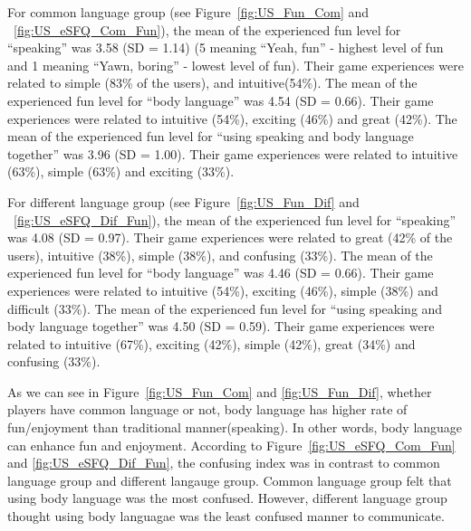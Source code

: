 For common language group (see Figure~\ref{fig:US_Fun_Com} and ~\ref{fig:US_eSFQ_Com_Fun}), the mean of the experienced fun level for ``speaking'' was 3.58 (SD = 1.14) (5 meaning ``Yeah, fun'' - highest level of fun and 1 meaning ``Yawn, boring'' - lowest level of fun). Their game experiences were related to simple (83\% of the users), and intuitive(54\%). The mean of the experienced fun level for ``body language'' was 4.54 (SD = 0.66). Their game experiences were related to intuitive (54\%), exciting (46\%) and great (42\%). The mean of the experienced fun level for ``using speaking and body language together'' was 3.96 (SD = 1.00). Their game experiences were related to intuitive (63\%), simple (63\%) and exciting (33\%). 

For different language group (see Figure~\ref{fig:US_Fun_Dif} and ~\ref{fig:US_eSFQ_Dif_Fun}), the mean of the experienced fun level for ``speaking'' was 4.08 (SD = 0.97). Their game experiences were related to great (42\% of the users), intuitive (38\%), simple (38\%), and confusing (33\%). The mean of the experienced fun level for ``body language'' was 4.46 (SD = 0.66). Their game experiences were related to intuitive (54\%), exciting (46\%), simple (38\%) and difficult (33\%). The mean of the experienced fun level for ``using speaking and body language together'' was 4.50 (SD = 0.59). Their game experiences were related to intuitive (67\%), exciting (42\%), simple (42\%), great (34\%) and confusing (33\%).


As we can see in Figure~\ref{fig:US_Fun_Com} and \ref{fig:US_Fun_Dif}, whether players have common language or not, body language has higher rate of fun/enjoyment than traditional manner(speaking). In other words, body language can enhance fun and enjoyment. According to Figure~\ref{fig:US_eSFQ_Com_Fun} and \ref{fig:US_eSFQ_Dif_Fun}, the confusing index was in contrast to common language group and different langauge group. Common language group felt that using body language was the most confused. However, different language group thought using body languagae was the least confused manner to communicate.

